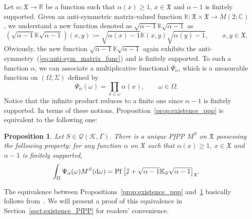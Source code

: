 \documentclass[pdftex]{sigma}
\numberwithin{equation}{section}
\newtheorem{Proposition}[Theorem]{Proposition}
 { \theoremstyle{definition}
\newtheorem{Definition}[Theorem]{Definition}
\newtheorem{Example}[Theorem]{Example}
\newtheorem{Remark}[Theorem]{Remark} }
\newcommand{\pf}{\operatorname{Pf}}
\newcommand{\mfrak}[1]{\mathfrak{#1}}
\newcommand{\mcal}[1]{\mathcal{#1}}
\newcommand{\mbb}[1]{\mathbb{#1}}
\begin{document}
Let $\alpha\colon \mfrak{X}\to\mbb{R}$ be a function such that $\alpha (x)\ge 1$, $x\in\mfrak{X}$ and $\alpha-1$ is finitely supported. Given an anti-symmetric matrix-valued function $\mbb{K}\colon \mfrak{X}\times\mfrak{X}\to M(2;\mbb{C})$, we understand a new function denoted as $\sqrt{\alpha-1}\mbb{K}\sqrt{\alpha-1}$ as
\begin{equation*}
	\left(\sqrt{\alpha-1}\mbb{K}\sqrt{\alpha-1}\right)(x,y):=\sqrt{\alpha (x)-1}\mbb{K}(x,y)\sqrt{\alpha (y)-1},\qquad x,y\in\mfrak{X}.
\end{equation*}
Obviously, the new function $\sqrt{\alpha-1}\mbb{K}\sqrt{\alpha-1}$ again exhibits the anti-symmetry~(\ref{eq:anti-sym_matrix_func}) and is finitely supported.
To such a function $\alpha$, we can associate a multiplicative functional $\Psi_{\alpha}$, which is a measurable function on $(\Omega,\Sigma)$ defined by
\begin{equation*}
	\Psi_{\alpha}(\omega)=\prod_{x\in\omega}\alpha (x),\qquad \omega\in \Omega.
\end{equation*}
Notice that the infinite product reduces to a finite one since $\alpha -1$ is finitely supported.
In terms of these notions, Proposition~\ref{prop:existence_ppp} is equivalent to the following one:
\begin{Proposition}\label{prop:existence_ppp_fredholm}
Let $S\in\mcal{Q}(\mcal{K},\Gamma)$. There is a unique PfPP $M^{S}$ on $\mfrak{X}$ possessing the following property: for any function $\alpha$ on $\mfrak{X}$ such that $\alpha (x)\ge 1$, $x\in\mfrak{X}$ and $\alpha -1$ is finitely supported,
\begin{equation*}
	\int_{\Omega}\Psi_{\alpha}(\omega) M^{S}({\rm d}\omega)=\pf\big[\mbb{J}+\sqrt{\alpha-1}\mbb{K}_{S}\sqrt{\alpha-1}\big]_{\mfrak{X}}.
\end{equation*}
\end{Proposition}
The equivalence between Propositions~\ref{prop:existence_ppp} and~\ref{prop:existence_ppp_fredholm} basically follows from~\cite{Rains2000}. We will present a proof of this equivalence in Section~\ref{sect:existence_PfPP} for readers' convenience.
\end{document}
